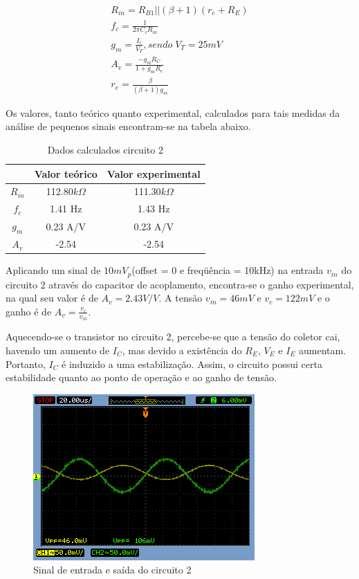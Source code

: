 \documentclass[a4paper]{article} %
\begin{document}
\begin{eqnarray}
R_{in}=R_{B1}||(\beta+1)(r_{e}+R_E)\\
f_c=\frac{1}{2\pi C_cR_{in}}\\
g_m=\frac{I_c}{V_T},sendo \; V_T = 25 mV\\
A_v=\frac{-g_mR_C}{1+g_mR_e}\\
r_{e}=\frac{\beta}{(\beta+1)g_m}
\end{eqnarray}

Os valores, tanto teórico quanto experimental, calculados para tais medidas da análise
de pequenos sinais encontram-se na tabela abaixo.

\begin{table}[h!]
\begin{centering}
\begin{tabular}{ccc}
\hline 
 & Valor teórico & Valor experimental\tabularnewline
\hline
\hline 
$R_{in}$ & 112.80$k\Omega$ & 111.30$k\Omega$\tabularnewline
$f_{c}$ & 1.41 Hz & 1.43 Hz\tabularnewline
$g_{m}$ & 0.23 A/V & 0.23 A/V\tabularnewline
$A_{v}$ & -2.54 & -2.54\tabularnewline
\hline
\end{tabular}
\par\end{centering}

\caption{Dados calculados circuito 2}

\end{table}
%
Aplicando um sinal de $10mV_p$(offset = 0 e freqüência = 10kHz) na entrada $v_{in}$
do circuito 2 através do capacitor de acoplamento, encontra-se o ganho experimental, na qual seu
valor é de $A_v=2.43V/V$. A tensão $v_{in}=46mV$ e $v_c=122mV$ e o ganho é de  $A_v=\frac{v_c}{v_{in}}$.

Aquecendo-se o transistor no circuito 2, percebe-se que a tensão do coletor
cai, havendo um aumento de $I_C$, mas devido a existência do $R_E$, $V_E$ e $I_E$ aumentam. Portanto, $I_C$ é induzido a uma estabilização.
Assim, o circuito possui certa estabilidade quanto ao ponto de operação e ao ganho de tensão.

\begin{figure}[h!]
\begin{centering}
\includegraphics[scale=0.5]{figuras03/3} \caption{Sinal de entrada e saída do circuito 2 \label{fig:3}}
\par\end{centering}
\end{figure}
\end{document}
